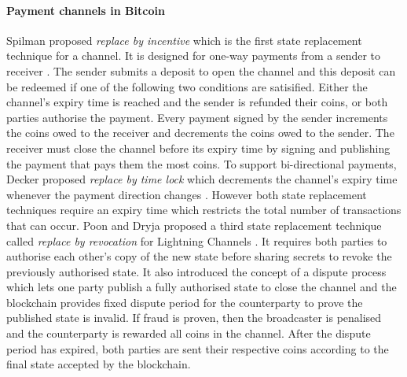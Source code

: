 \documentclass{llncs}
\begin{document}
	\paragraph{Payment channels in Bitcoin} 
	Spilman proposed \textit{replace by incentive} which is the first state replacement technique for a channel.
	It is designed for one-way payments from a sender to receiver \cite{spilman2013}.
	The sender submits a deposit to open the channel and this deposit can be redeemed if one of the following two conditions are satisified. 
	Either the channel's expiry time is reached and the sender is refunded their coins, or both parties authorise the payment. 
	Every payment signed by the sender increments the coins owed to the receiver and decrements the coins owed to the sender.  
	The receiver must close the channel before its expiry time by signing and publishing the payment that pays them the most coins. 
	To support bi-directional payments, Decker proposed \textit{replace by time lock} which decrements the channel's expiry time whenever the payment direction changes \cite{decker2015fast}.
	However both state replacement techniques require an expiry time which restricts the total number of transactions that can occur. 
	Poon and Dryja proposed a third state replacement technique called \textit{replace by revocation} for Lightning Channels \cite{poon2016bitcoin}.  
	It requires both parties to authorise each other's copy of the new state before sharing secrets to revoke the previously authorised state. 
	It also introduced the concept of a dispute process which lets one party publish a fully authorised state to close the channel and the blockchain provides fixed dispute period for the counterparty to prove the published state is invalid.
	If fraud is proven, then the broadcaster is penalised and the counterparty is rewarded all coins in the channel.
	After the dispute period has expired, both parties are sent their respective coins according to the final state accepted by the blockchain. 
	
	
\end{document}
